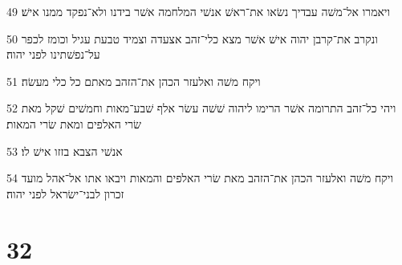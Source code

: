 \par 49 ויאמרו אל־משׁה עבדיך נשׂאו את־ראשׁ אנשׁי המלחמה אשׁר בידנו ולא־נפקד ממנו אישׁ׃
\par 50 ונקרב את־קרבן יהוה אישׁ אשׁר מצא כלי־זהב אצעדה וצמיד טבעת עגיל וכומז לכפר על־נפשׁתינו לפני יהוה׃
\par 51 ויקח משׁה ואלעזר הכהן את־הזהב מאתם כל כלי מעשׂה׃
\par 52 ויהי כל־זהב התרומה אשׁר הרימו ליהוה שׁשׁה עשׂר אלף שׁבע־מאות וחמשׁים שׁקל מאת שׂרי האלפים ומאת שׂרי המאות׃
\par 53 אנשׁי הצבא בזזו אישׁ לו׃
\par 54 ויקח משׁה ואלעזר הכהן את־הזהב מאת שׂרי האלפים והמאות ויבאו אתו אל־אהל מועד זכרון לבני־ישׂראל לפני יהוה׃

\chapter{32}

